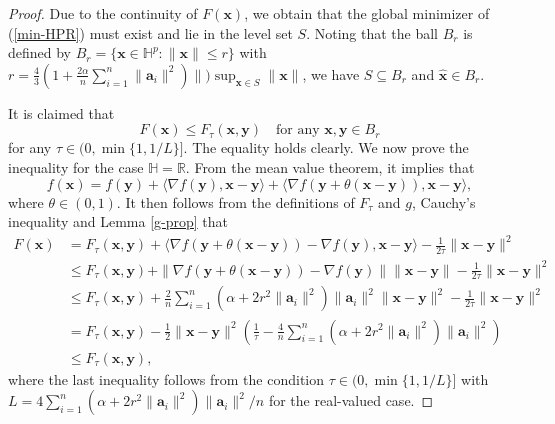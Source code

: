 \documentclass{article}
\numberwithin{equation}{section}
\begin{document}
\begin{proof}
Due to the continuity of $F(\mathbf{x})$, we obtain that the global minimizer of (\ref{min-HPR}) must exist and lie in the level set $S$. Noting that the ball $B_r$ is defined by $B_r=\{\mathbf{x}\in\mathbb{H}^p: \|\mathbf{x}\|\leq r\}$ with $r=\frac{4}{3}(1+ \frac{2\alpha}{n}\sum_{i=1}^n\|\mathbf{a}_i\|^2)\|)\sup_{\mathbf{x}\in S}\|\mathbf{x}\|$, we have $S\subseteq B_r$ and $\hat{\mathbf{x}}\in B_r$.

It is claimed that
\begin{equation}\label{MM-HPR}
F(\mathbf{x})\leq F_{\tau}(\mathbf{x},\mathbf{y})\quad \mbox{for any}\,\, \mathbf{x},\mathbf{y}\in B_r
\end{equation}
for any $\tau\in(0, \min\{1, 1/L\}]$.
The equality holds clearly. We now prove the inequality for the case $\mathbb{H}=\mathbb{R}$.
From the mean value theorem, it implies that
\begin{equation}\label{tildef-mvt}
f(\mathbf{x})=f(\mathbf{y})
+\langle\nabla f(\mathbf{y}),\mathbf{x}-\mathbf{y}\rangle
+\langle\nabla f(\mathbf{y}+\theta(\mathbf{x}-\mathbf{y})),\mathbf{x}-\mathbf{y}\rangle,\nonumber
\end{equation}
where $\theta\in(0,1)$. It then follows from the definitions of $F_\tau$ and $g$, Cauchy's inequality and Lemma \ref{g-prop} that
\begin{equation}
\begin{aligned}
	F(\mathbf{x})&=F_\tau(\mathbf{x},\mathbf{y})+\langle\nabla f(\mathbf{y}+\theta(\mathbf{x}-\mathbf{y}))-\nabla f(\mathbf{y}),\mathbf{x}-\mathbf{y}\rangle
	-\frac{1}{2\tau}\|\mathbf{x}-\mathbf{y}\|^2\\
	&\leq F_\tau(\mathbf{x},\mathbf{y})+\|\nabla f(\mathbf{y}+\theta(\mathbf{x}-\mathbf{y}))-\nabla f(\mathbf{y})\|\|\mathbf{x}-\mathbf{y}\|
	-\frac{1}{2\tau}\|\mathbf{x}-\mathbf{y}\|^2\\
	&\leq F_\tau(\mathbf{x},\mathbf{y})+\frac{2}{n}\sum_{i=1}^n (\alpha+2r^2\|\mathbf{a}_i\|^2)\|\mathbf{a}_i\|^2\|\mathbf{x}-\mathbf{y}\|^2
	-\frac{1}{2\tau}\|\mathbf{x}-\mathbf{y}\|^2\\
	&= F_\tau(\mathbf{x},\mathbf{y})
	-\frac{1}{2}\|\mathbf{x}-\mathbf{y}\|^2(\frac{1}{\tau}-\frac{4}{n}\sum_{i=1}^n (\alpha+2r^2\|\mathbf{a}_i\|^2)\|\mathbf{a}_i\|^2)\\
	&\leq F_\tau(\mathbf{x},\mathbf{y}),\nonumber
\end{aligned}
\end{equation}
where the last inequality follows from the condition $\tau\in(0, \min\{1, 1/L\}]$ with $L=4\sum_{i=1}^n(\alpha+2r^2\|\mathbf{a}_i\|^2)\|\mathbf{a}_i\|^2/n$ for the real-valued case.


\end{proof}
\end{document}
